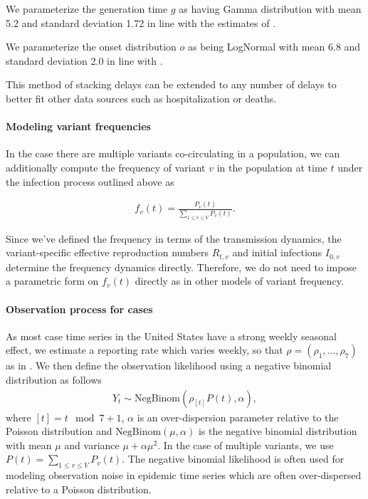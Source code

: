 \documentclass[12pt]{article}
\begin{document}
We parameterize the generation time $g$ as having Gamma distribution with mean 5.2 and standard deviation 1.72 in line with the estimates of \cite{Ganyani2020}.

We parameterize the onset distribution $o$ as being LogNormal with mean 6.8 and standard deviation 2.0 in line with \cite{Cheng2021}.


This method of stacking delays can be extended to any number of delays to better fit other data sources such as hospitalization or deaths.

\paragraph{Modeling variant frequencies}%

In the case there are multiple variants co-circulating in a population, we can additionally compute the frequency of variant $v$ in the population at time $t$ under the infection process outlined above as

\begin{align*}
  f_{v}(t) = \frac{P_{v}(t)}{ \sum_{1\leq v \leq V} P_{v}(t)}.
\end{align*}

Since we've defined the frequency in terms of the transmission dynamics, the variant-specific effective reproduction numbers $R_{t,v}$ and initial infections $I_{0, v}$ determine the frequency dynamics directly. 
Therefore, we do not need to impose a parametric form on $f_{v}(t)$ directly as in other models of variant frequency.

\paragraph{Observation process for cases}%

As most case time series in the United States have a strong weekly seasonal effect, we estimate a reporting rate which varies weekly, so that $\rho = (\rho_{1}, \ldots, \rho_{7})$ as in \cite{Abbott2020}. 
We then define the observation likelihood using a negative binomial distribution as follows
\begin{align*}
  Y_{t} \sim \text{NegBinom}(\rho_{[t]} P(t),  \alpha),
\end{align*}
where $[t] = t \mod 7 + 1$, $\alpha$ is an over-dispersion parameter relative to the Poisson distribution and $\text{NegBinom}(\mu, \alpha)$ is the negative binomial distribution with mean $\mu$ and variance  $\mu + \alpha\mu^{2}$. In the case of multiple variants, we use $P(t) = \sum_{1\leq v \leq V} P_{v}(t)$. 
The negative binomial likelihood is often used for modeling observation noise in epidemic time series which are often over-dispersed relative to a Poisson distribution. %
\end{document}
